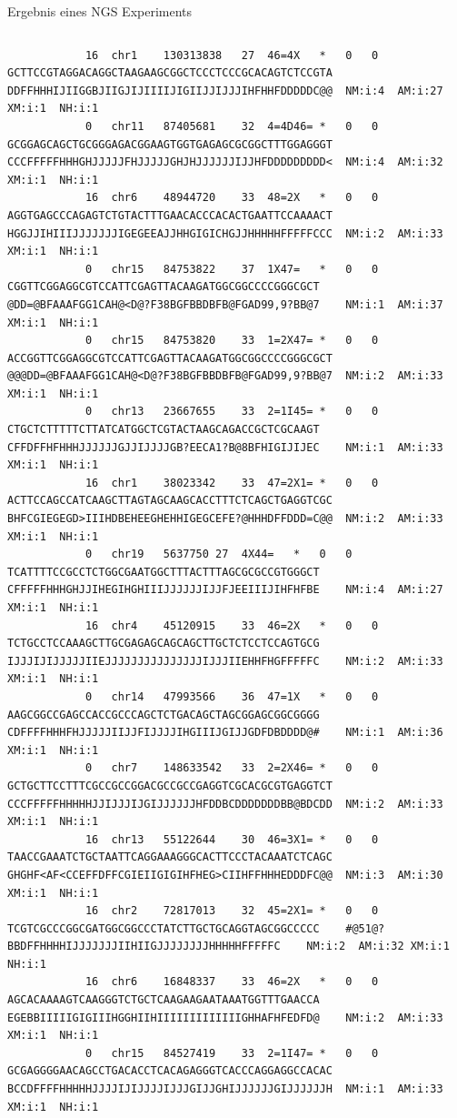\documentclass[10pt]{beamer}
\begin{document}
\begin{frame}[fragile]{Ergebnis eines NGS Experiments}
	\begin{columns}
		\column{\dimexpr\paperwidth-3cm}
		\begin{lstlisting}
			16	chr1	130313838	27	46=4X	*	0	0	GCTTCCGTAGGACAGGCTAAGAAGCGGCTCCCTCCCGCACAGTCTCCGTA	DDFFHHHIJIIGGBJIIGJIJIIIIJIGIIJJIJJJIHFHHFDDDDDC@@	NM:i:4	AM:i:27	XM:i:1	NH:i:1
			0	chr11	87405681	32	4=4D46=	*	0	0	GCGGAGCAGCTGCGGGAGACGGAAGTGGTGAGAGCGCGGCTTTGGAGGGT	CCCFFFFFHHHGHJJJJJFHJJJJJGHJHJJJJJJIJJHFDDDDDDDDD<	NM:i:4	AM:i:32	XM:i:1	NH:i:1
			16	chr6	48944720	33	48=2X	*	0	0	AGGTGAGCCCAGAGTCTGTACTTTGAACACCCACACTGAATTCCAAAACT	HGGJJIHIIIJJJJJJJIGEGEEAJJHHGIGICHGJJHHHHHFFFFFCCC	NM:i:2	AM:i:33	XM:i:1	NH:i:1
			0	chr15	84753822	37	1X47=	*	0	0	CGGTTCGGAGGCGTCCATTCGAGTTACAAGATGGCGGCCCCGGGCGCT	@DD=@BFAAAFGG1CAH@<D@?F38BGFBBDBFB@FGAD99,9?BB@7	NM:i:1	AM:i:37	XM:i:1	NH:i:1
			0	chr15	84753820	33	1=2X47=	*	0	0	ACCGGTTCGGAGGCGTCCATTCGAGTTACAAGATGGCGGCCCCGGGCGCT	@@@DD=@BFAAAFGG1CAH@<D@?F38BGFBBDBFB@FGAD99,9?BB@7	NM:i:2	AM:i:33	XM:i:1	NH:i:1
			0	chr13	23667655	33	2=1I45=	*	0	0	CTGCTCTTTTTCTTATCATGGCTCGTACTAAGCAGACCGCTCGCAAGT	CFFDFFHFHHHJJJJJJGJJIJJJJGB?EECA1?B@8BFHIGIJIJEC	NM:i:1	AM:i:33	XM:i:1	NH:i:1
			16	chr1	38023342	33	47=2X1=	*	0	0	ACTTCCAGCCATCAAGCTTAGTAGCAAGCACCTTTCTCAGCTGAGGTCGC	BHFCGIEGEGD>IIIHDBEHEEGHEHHIGEGCEFE?@HHHDFFDDD=C@@	NM:i:2	AM:i:33	XM:i:1	NH:i:1
			0	chr19	5637750	27	4X44=	*	0	0	TCATTTTCCGCCTCTGGCGAATGGCTTTACTTTAGCGCGCCGTGGGCT	CFFFFFHHHGHJJIHEGIHGHIIIJJJJJJIJJFJEEIIIJIHFHFBE	NM:i:4	AM:i:27	XM:i:1	NH:i:1
			16	chr4	45120915	33	46=2X	*	0	0	TCTGCCTCCAAAGCTTGCGAGAGCAGCAGCTTGCTCTCCTCCAGTGCG	IJJJIJIJJJJJIIEJJJJJJJJJJJJJJJIJJJIIEHHFHGFFFFFC	NM:i:2	AM:i:33	XM:i:1	NH:i:1
			0	chr14	47993566	36	47=1X	*	0	0	AAGCGGCCGAGCCACCGCCCAGCTCTGACAGCTAGCGGAGCGGCGGGG	CDFFFFHHHFHJJJJJIIJJFIJJJJIHGIIIJGIJJGDFDBDDDD@#	NM:i:1	AM:i:36	XM:i:1	NH:i:1
			0	chr7	148633542	33	2=2X46=	*	0	0	GCTGCTTCCTTTCGCCGCCGGACGCCGCCGAGGTCGCACGCGTGAGGTCT	CCCFFFFFHHHHHJJIJJJIJGIJJJJJJHFDDBCDDDDDDDBB@BDCDD	NM:i:2	AM:i:33	XM:i:1	NH:i:1
			16	chr13	55122644	30	46=3X1=	*	0	0	TAACCGAAATCTGCTAATTCAGGAAAGGGCACTTCCCTACAAATCTCAGC	GHGHF<AF<CCEFFDFFCGIEIIGIGIHFHEG>CIIHFFHHHEDDDFC@@	NM:i:3	AM:i:30	XM:i:1	NH:i:1
			16	chr2	72817013	32	45=2X1=	*	0	0	TCGTCGCCCGGCGATGGCGGCCCTATCTTGCTGCAGGTAGCGGCCCCC	#@51@?BBDFFHHHHIJJJJJJJIIHIIGJJJJJJJJHHHHHFFFFFC	NM:i:2	AM:i:32	XM:i:1	NH:i:1
			16	chr6	16848337	33	46=2X	*	0	0	AGCACAAAAGTCAAGGGTCTGCTCAAGAAGAATAAATGGTTTGAACCA	EGEBBIIIIIGIGIIIHGGHIIHIIIIIIIIIIIIIGHHAFHFEDFD@	NM:i:2	AM:i:33	XM:i:1	NH:i:1
			0	chr15	84527419	33	2=1I47=	*	0	0	GCGAGGGGAACAGCCTGACACCTCACAGAGGGTCACCCAGGAGGCCACAC	BCCDFFFFHHHHHJJJJIJIJJJJIJJJGIJJGHIJJJJJJGIJJJJJJH	NM:i:1	AM:i:33	XM:i:1	NH:i:1

\end{lstlisting}
\end{columns}
\end{frame}
\end{document}
